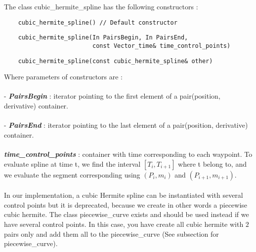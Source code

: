 \documentclass{article}
\begin{document}
    \noindent
    The class cubic\_hermite\_spline has the following constructors :
    \begin{lstlisting}
    cubic_hermite_spline() // Default constructor
    \end{lstlisting}
    \begin{lstlisting}
    cubic_hermite_spline(In PairsBegin, In PairsEnd,
                         const Vector_time& time_control_points)
    \end{lstlisting}
    \begin{lstlisting}
    cubic_hermite_spline(const cubic_hermite_spline& other)
    \end{lstlisting}

    \noindent
    Where parameters of constructors are :\\\\
    - \textbf{\textit{PairsBegin}} : iterator pointing to the first element of a pair(position, derivative) container.\\\\
    - \textbf{\textit{PairsEnd}} : iterator pointing to the last element of a pair(position, derivative) container.\\\\
    \textbf{\textit{time\_control\_points}} : container with time corresponding to each waypoint. To evaluate spline at time t, we find the interval $[T_i,T_{i+1}]$ where t belong to, and we evaluate the segment corresponding using $(P_i,m_i)$ and $(P_{i+1},m_{i+1})$.\\\\

    In our implementation, a cubic Hermite spline can be instantiated with several control points but it is deprecated, because we create in other words a piecewise cubic hermite. The class piecewise\_curve exists and should be used instead if we have several control points. In this case, you have create all cubic hermite with $2$ pairs only and add them all to the piecewise\_curve (See subsection for piecewise\_curve).
\end{document}
